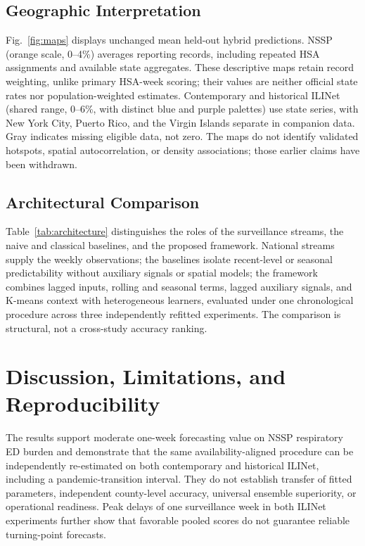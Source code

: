 \documentclass[conference,a4paper]{IEEEtran}
\begin{document}
\subsection{Geographic Interpretation}
Fig.~\ref{fig:maps} displays unchanged mean held-out hybrid predictions. NSSP (orange scale, 0--4\%) averages reporting records, including repeated HSA assignments and available state aggregates. These descriptive maps retain record weighting, unlike primary HSA-week scoring; their values are neither official state rates nor population-weighted estimates. Contemporary and historical ILINet (shared range, 0--6\%, with distinct blue and purple palettes) use state series, with New York City, Puerto Rico, and the Virgin Islands separate in companion data. Gray indicates missing eligible data, not zero. The maps do not identify validated hotspots, spatial autocorrelation, or density associations; those earlier claims have been withdrawn.

\subsection{Architectural Comparison}
Table~\ref{tab:architecture} distinguishes the roles of the surveillance streams, the naive and classical baselines, and the proposed framework. National streams supply the weekly observations; the baselines isolate recent-level or seasonal predictability without auxiliary signals or spatial models; the framework combines lagged inputs, rolling and seasonal terms, lagged auxiliary signals, and K-means context with heterogeneous learners, evaluated under one chronological procedure across three independently refitted experiments. The comparison is structural, not a cross-study accuracy ranking.

\begin{table}[!ht]

\end{table}

\section{Discussion, Limitations, and Reproducibility}
The results support moderate one-week forecasting value on NSSP respiratory ED burden and demonstrate that the same availability-aligned procedure can be independently re-estimated on both contemporary and historical ILINet, including a pandemic-transition interval. They do not establish transfer of fitted parameters, independent county-level accuracy, universal ensemble superiority, or operational readiness. Peak delays of one surveillance week in both ILINet experiments further show that favorable pooled scores do not guarantee reliable turning-point forecasts.
\end{document}
